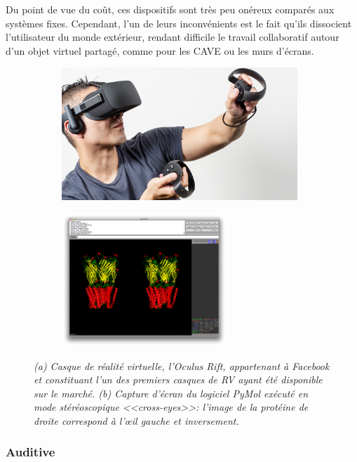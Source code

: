 Du point de vue du coût, ces dispositifs sont très peu onéreux comparés aux systèmes fixes. Cependant, l'un de leurs inconvénients est le fait qu'ils dissocient l'utilisateur du monde extérieur, rendant difficile le travail collaboratif autour d'un objet virtuel partagé, comme pour les CAVE ou les murs d'écrans.

\begin{figure}
\begin{subfigure}{.6\textwidth}
  \centering
  {\includegraphics[height=5cm]{./figures/ch2/occulus}}
    \caption{}
  \label{Fig:occulus}
\end{subfigure}
\begin{subfigure}{.4\textwidth}
  \centering
  {\includegraphics[height=5cm]{./figures/ch2/pymol_stereo}}
    \caption{}
  \label{Fig:pymol_stereo}
\end{subfigure}
\caption[(a) Casque de Réalité Virtuelle. (b) Capture d'écran du logiciel PyNol en mode stéréoscopique.]{\it (a) Casque de réalité virtuelle, l'Oculus Rift, appartenant à Facebook et constituant l'un des premiers casques de RV ayant été disponible sur le marché. (b) Capture d'écran du logiciel PyMol exécuté en mode stéréoscopique <<cross-eyes>>: l'image de la protéine de droite correspond à l'œil gauche et inversement.}
\end{figure}



\subsubsection{Auditive} \label{immersion_audio}

